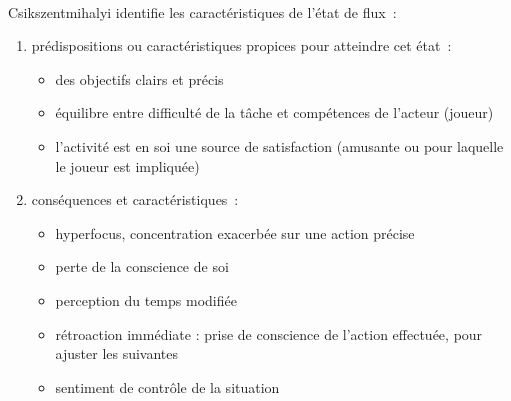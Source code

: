 \paragraph{}
Csikszentmihalyi identifie les caractéristiques de l’état de flux~:
\begin{enumerate}
   \item prédispositions ou caractéristiques propices pour atteindre cet état~:
         \begin{itemize}
            \item des objectifs clairs et précis
            \item équilibre entre difficulté de la tâche et compétences de l’acteur (joueur)
            \item l’activité est en soi une source de satisfaction (amusante ou pour laquelle le joueur est impliquée)
         \end{itemize}
   \item conséquences et caractéristiques~:
   	\begin{itemize}
            \item hyperfocus, concentration exacerbée sur une action précise
            \item perte de la conscience de soi
            \item perception du temps modifiée
            \item rétroaction immédiate : prise de conscience de l’action effectuée, pour ajuster les suivantes
            \item sentiment de contrôle de la situation
	\end{itemize}
\end{enumerate}
